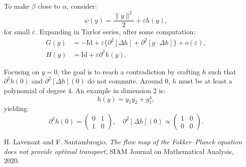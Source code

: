 \documentclass{article}
\begin{document}
To make $\beta$ close to $\alpha$, consider:
\[
    \psi(y) = \frac{\|y\|^2}{2} + \varepsilon h(y),
\]
for small $\varepsilon$. Expanding in Taylor series, after some computation:
\begin{align*}
    G(y) &= -\text{Id} + \varepsilon \{\partial^2[\Delta h] + \partial^2[y \cdot \Delta h]\} + o(\varepsilon), \\
    H(y) &= \text{Id} + \varepsilon \partial^2 h(y).
\end{align*}

Focusing on $y = 0$, the goal is to reach a contradiction by crafting $h$ such that  $\partial^2 h(0)$  and   $\partial^2[\Delta h](0)$ do not commute. 
Around $0$, $h$ must be at least a polynomial of degree 4. An example in dimension 2 is:
\[
    h(y) = y_1 y_2 + y_1^4,
\]
yielding:
\[
    \partial^2 h(0) = \begin{pmatrix} 0 & 1 \\ 1 & 0 \end{pmatrix}, \quad 
    \partial^2[\Delta h](0) \propto \begin{pmatrix} 1 & 0 \\ 0 & 0 \end{pmatrix}.
\]

\begin{thebibliography}{9}
    H. Lavenant and F. Santambrogio, \emph{The flow map of the Fokker--Planck equation does not provide optimal transport}, SIAM Journal on Mathematical Analysis, 2020.
\end{thebibliography}
\end{document}
